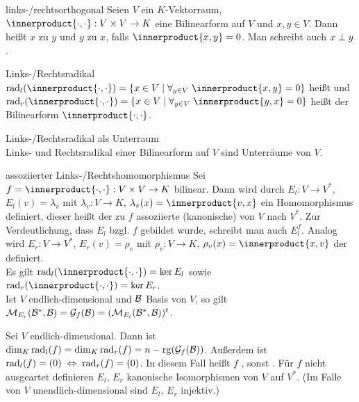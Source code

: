 \begin{Def}{links-/rechtsorthogonal}
    Seien $V$ ein $K$-Vektorraum, $\innerproduct{\cdot, \cdot}: V \times V \rightarrow K$
    eine Bilinearform auf $V$ und $x, y \in V$.
    Dann heißt $x$  zu $y$ und $y$
     zu $x$, falls $\innerproduct{x, y} = 0$.
    Man schreibt auch $x \;\bot\; y$.
\end{Def}

\begin{Def}{Links-/Rechtsradikal}
    $\rad_l(\innerproduct{\cdot, \cdot}) = \{x \in V \;|\;
    \forall_{y \in V}\; \innerproduct{x, y} = 0\}$
    heißt  und
    $\rad_r(\innerproduct{\cdot, \cdot}) = \{x \in V \;|\;
    \forall_{y \in V}\; \innerproduct{y, x} = 0\}$
    heißt  der Bilinearform $\innerproduct{\cdot, \cdot}$.
\end{Def}

\begin{Satz}{Links-/Rechtsradikal als Unterraum} \\
    Links- und Rechtsradikal einer Bilinearform auf $V$ sind Unterräume von
    $V$.
\end{Satz}

\begin{Satz}{assoziierter Links-/Rechtshomomorphismus}
    Sei $f = \innerproduct{\cdot, \cdot}: V \times V \rightarrow K$ bilinear.
    Dann wird durch
    $E_l: V \rightarrow V^\ast$, $E_l(v) = \lambda_v$ mit
    $\lambda_v: V \rightarrow K$, $\lambda_v(x) = \innerproduct{v, x}$
    ein Homomorphismus definiert, dieser heißt der zu $f$ assoziierte
    (kanonische)  von $V$ nach $V^\ast$.
    Zur Verdeutlichung, dass $E_l$ bzgl. $f$ gebildet wurde, schreibt man
    auch $E_l^f$.
    Analog wird $E_r: V \rightarrow V^\ast$, $E_r(v) = \rho_v$ mit
    $\rho_v: V \rightarrow K$, $\rho_v(x) = \innerproduct{x, v}$
    der  definiert. \\
    Es gilt $\rad_l(\innerproduct{\cdot, \cdot}) = \ker E_l$ sowie
    $\rad_r(\innerproduct{\cdot, \cdot}) = \ker E_r$. \\
    Ist $V$ endlich-dimensional und $\mathcal{B}$ Basis von $V$, so gilt
    $\mathcal{M}_{E_r}(\mathcal{B^\ast},\mathcal{B}) = \mathcal{G}_f(\mathcal{B}) =
    (\mathcal{M}_{E_l}(\mathcal{B^\ast},\mathcal{B}))^t$.
\end{Satz}

\begin{Kor}
    Sei $V$ endlich-dimensional.
    Dann ist $\dim_K \operatorname{rad}_l(f) = \dim_K \operatorname{rad}_r(f) =
    n - \operatorname{rg}(\mathcal{G}_f(\mathcal{B}))$.
    Außerdem ist $\operatorname{rad}_l(f) = (0) \;\Leftrightarrow\; \operatorname{rad}_r(f) = (0)$.
    In diesem Fall heißt $f$ , sonst
    .
    Für $f$ nicht ausgeartet definieren $E_l$, $E_r$ kanonische Isomorphismen
    von $V$ auf $V^\ast$.
    (Im Falle von $V$ unendlich-dimensional sind $E_l$, $E_r$ injektiv.)
\end{Kor}

